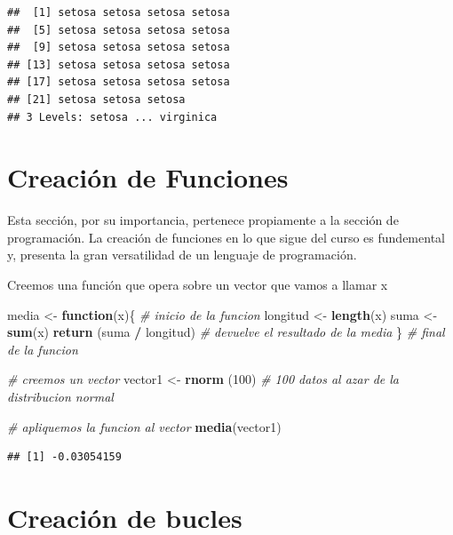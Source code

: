 \documentclass[
]{book}
\newenvironment{Shaded}{\begin{snugshade}}{\end{snugshade}}
\newcommand{\CommentTok}[1]{\textcolor[rgb]{0.56,0.35,0.01}{\textit{#1}}}
\newcommand{\ControlFlowTok}[1]{\textcolor[rgb]{0.13,0.29,0.53}{\textbf{#1}}}
\newcommand{\DecValTok}[1]{\textcolor[rgb]{0.00,0.00,0.81}{#1}}
\newcommand{\KeywordTok}[1]{\textcolor[rgb]{0.13,0.29,0.53}{\textbf{#1}}}
\newcommand{\NormalTok}[1]{#1}
\newcommand{\OperatorTok}[1]{\textcolor[rgb]{0.81,0.36,0.00}{\textbf{#1}}}
\newcommand{\StringTok}[1]{\textcolor[rgb]{0.31,0.60,0.02}{#1}}
\begin{document}
\begin{verbatim}
##  [1] setosa setosa setosa setosa
##  [5] setosa setosa setosa setosa
##  [9] setosa setosa setosa setosa
## [13] setosa setosa setosa setosa
## [17] setosa setosa setosa setosa
## [21] setosa setosa setosa
## 3 Levels: setosa ... virginica
\end{verbatim}

\hypertarget{creaciuxf3n-de-funciones}{%
\chapter{Creación de Funciones}\label{creaciuxf3n-de-funciones}}

Esta sección, por su importancia, pertenece propiamente a la sección de programación. La creación de funciones en lo que sigue del curso es fundemental y, presenta la gran versatilidad de un lenguaje de programación.

Creemos una función que opera sobre un vector que vamos a llamar x

\begin{Shaded}
\begin{Highlighting}[]
\NormalTok{media <-}\StringTok{ }\ControlFlowTok{function}\NormalTok{(x)\{     }\CommentTok{# inicio de la funcion}
\NormalTok{ longitud <-}\StringTok{ }\KeywordTok{length}\NormalTok{(x)}
\NormalTok{ suma <-}\StringTok{ }\KeywordTok{sum}\NormalTok{(x)}
 \KeywordTok{return}\NormalTok{ (suma }\OperatorTok{/}\StringTok{ }\NormalTok{longitud) }\CommentTok{# devuelve el resultado de la media}
\NormalTok{\}                         }\CommentTok{# final de la funcion}


\CommentTok{# creemos un vector}
\NormalTok{vector1 <-}\StringTok{ }\KeywordTok{rnorm}\NormalTok{ (}\DecValTok{100}\NormalTok{) }\CommentTok{# 100 datos al azar de la distribucion normal}

\CommentTok{# apliquemos la funcion al vector}
\KeywordTok{media}\NormalTok{(vector1)}
\end{Highlighting}
\end{Shaded}

\begin{verbatim}
## [1] -0.03054159
\end{verbatim}

\hypertarget{creaciuxf3n-de-bucles}{%
\chapter{Creación de bucles}\label{creaciuxf3n-de-bucles}}
\end{document}
